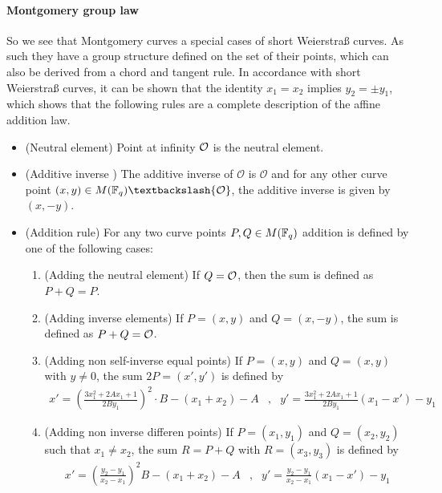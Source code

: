 \paragraph{Montgomery group law} So we see that Montgomery curves a special cases of short Weierstraß curves. As such they have a group structure defined on the set of their points, which can also be derived from a chord and tangent rule. In accordance with short Weierstraß curves, it can be shown that the identity $x_1=x_2$ implies $y_2=\pm y_1$, which shows that the following rules are a complete description of the affine addition law.
\begin{itemize}
\item (Neutral element) Point at infinity $\mathcal{O}$ is the neutral element.
\item (Additive inverse ) The additive inverse of $\mathcal{O}$ is $\mathcal{O}$ and for any other curve point $(x,y) \in M(\F_q)\textbackslash \{\mathcal{O}\}$, the additive inverse is given by $(x,-y)$.
\item (Addition rule) For any two curve points $P, Q \in M(\mathbb{F}_q)$ addition is defined by one of the following cases:
\begin{enumerate}
\item (Adding the neutral element) If $Q=\mathcal{O}$, then the sum is defined as $P+Q=P$.
\item (Adding inverse elements)  If $P=(x,y)$ and $Q=(x,-y)$, the sum is defined as $P+Q=\mathcal{O}$.
\item (Adding non self-inverse equal points) If $P=(x,y)$ and $Q=(x,y)$ with $y\neq 0$, the sum $2P=(x',y')$ is defined by
$$
\begin{array}{llr}
x' = (\frac{3x_1^2 + 2A x_1 +1}{2By_1})^2\cdot B - (x_1 + x_2) - A &,&
y' = \frac{3x_1^2 + 2A x_1 +1}{2By_1}(x_1-x') - y_1
\end{array} 
$$
\item (Adding non inverse differen points) If $P=(x_1,y_1)$ and $Q=(x_2,y_2)$ such that $x_1 \neq x_2$, the sum $R=P+Q$ with $R=(x_3,y_3)$ is defined by
$$
\begin{array}{llr}
x' = (\frac{y_2-y_1}{x_2-x_1})^2B - (x_1 + x_2) - A &, &
y' = \frac{y_2-y_1}{x_2-x_1}(x_1-x') - y_1
\end{array} 
$$
\end{enumerate}
\end{itemize} 
